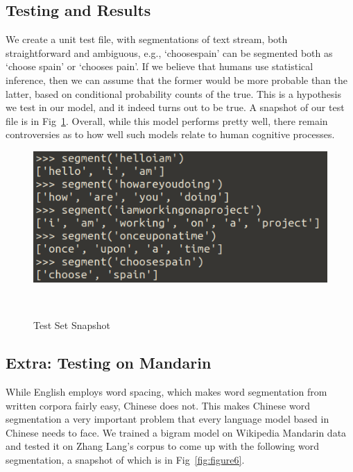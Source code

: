 \documentclass{article}
\begin{document}
\subsection{Testing and Results}
\vspace{-1mm}
We create a unit test file, with segmentations of text stream, both straightforward and ambiguous, e.g., `choosespain' can be segmented both as `choose spain' or `chooses pain'. If we believe that humans use statistical inference, then we can assume that the former would be more probable than the latter, based on conditional probability counts of the true. This is a hypothesis we test in our model, and it indeed turns out to be true. A snapshot of our test file is in Fig~\ref{fig:figure5}. Overall, while this model performs pretty well, there remain controversies as to how well such models relate to human cognitive processes.
\vspace{-1mm}
\begin{figure}[h!]
  \centering
  \includegraphics[scale=0.8]{figures/ngram_test_set.png}
  \caption{Test Set Snapshot}~\label{fig:figure5}
\end{figure}

\subsection{Extra: Testing on Mandarin}
\vspace{-1mm}
While English employs word spacing, which makes word segmentation from written corpora fairly easy, Chinese does not. This makes Chinese word segmentation a very important problem that every language model based in Chinese needs to face. We trained a bigram model on Wikipedia Mandarin data and tested it on Zhang Lang's corpus to come up with the following word segmentation, a snapshot of which is in Fig~\ref{fig:figure6}.
\end{document}
